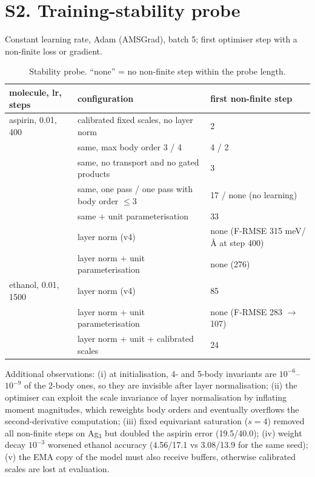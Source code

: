 \documentclass[journal=jctcce,manuscript=suppinfo,layout=traditional]{achemso}
\begin{document}
\section*{S2. Training-stability probe}
Constant learning rate, Adam (AMSGrad), batch 5; first optimiser step with a non-finite loss or gradient.

\begin{table}[h]
\caption{Stability probe. ``none'' = no non-finite step within the probe length.}
\label{tab:probe}
\small
\begin{tabular}{lp{6.2cm}p{4.3cm}}
\toprule
molecule, lr, steps & configuration & first non-finite step \\
\midrule
aspirin, 0.01, 400 & calibrated fixed scales, no layer norm & 2 \\
 & same, max body order 3 / 4 & 4 / 2 \\
 & same, no transport and no gated products & 3 \\
 & same, one pass / one pass with body order $\le3$ & 17 / none (no learning) \\
 & same + unit parameterisation & 33 \\
 & layer norm (v4) & none (F-RMSE 315 meV/\AA{} at step 400) \\
 & layer norm + unit parameterisation & none (276) \\
ethanol, 0.01, 1500 & layer norm (v4) & 85 \\
 & layer norm + unit parameterisation & none (F-RMSE 283 $\to$ 107) \\
 & layer norm + unit + calibrated scales & 24 \\
\bottomrule
\end{tabular}
\end{table}
Additional observations: (i) at initialisation, 4- and 5-body invariants are $10^{-6}$--$10^{-9}$ of the 2-body ones,
so they are invisible after layer normalisation; (ii) the optimiser can exploit the scale invariance of layer
normalisation by inflating moment magnitudes, which reweights body orders and eventually overflows the
second-derivative computation; (iii) fixed equivariant saturation ($s=4$) removed all non-finite steps on Ag$_3$ but
doubled the aspirin error (19.5/40.0); (iv) weight decay $10^{-3}$ worsened ethanol accuracy (4.56/17.1 vs
3.08/13.9 for the same seed); (v) the EMA copy of the model must also receive buffers, otherwise calibrated scales are
lost at evaluation.
\end{document}
